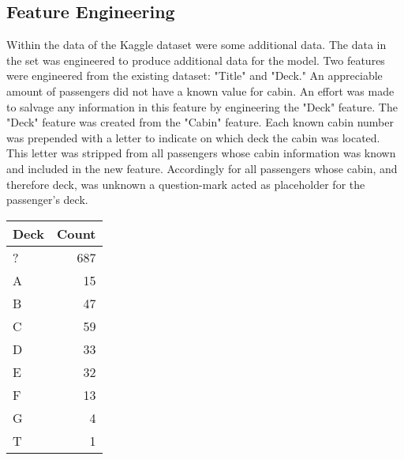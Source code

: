 \documentclass[10pt]{article}
\begin{document}
\begin{multicols}{2}
\subsection{Feature Engineering}
	Within the data of the Kaggle dataset were some additional data.
	The data in the set was engineered to produce additional data for the model.
	Two features were engineered from the existing dataset: "Title" and "Deck."
	An appreciable amount of passengers did not have a known value for cabin.
	An effort was made to salvage any information in this feature by engineering the "Deck" feature.
	The "Deck" feature was created from the "Cabin" feature.
	Each known cabin number was prepended with a letter to indicate on which deck the cabin was located.
	This letter was stripped from all passengers whose cabin information was known and included in the new feature.
	Accordingly for all passengers whose cabin, and therefore deck, was unknown a question-mark acted as placeholder for the passenger's deck.
	\begin{center}
	\begin{tabular}{l r}
		Deck	& Count\\
		\hline
		? 	& 687\\
		A 	& 15\\
		B 	& 47\\
		C 	& 59\\
		D 	& 33\\
		E 	& 32\\
		F 	& 13\\
		G 	& 4\\
		T 	& 1\\
	\end{tabular}
	\end{center}



\end{multicols}
\end{document}
